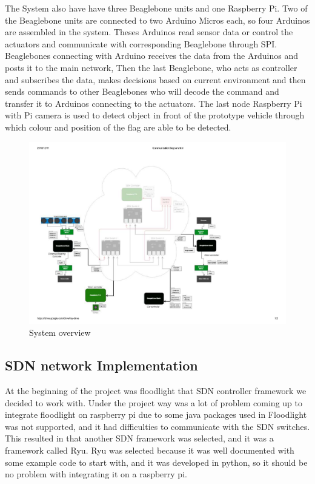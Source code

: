 \documentclass[11pt, titlepage]{article} %
\begin{document}
The System also have have three Beaglebone units and one Raspberry Pi. Two of the Beaglebone units are connected to two Arduino Micros each, so four Arduinos are assembled in the system. Theses Arduinos read sensor data or control the actuators and communicate with corresponding Beaglebone through SPI. Beaglebones connecting with Arduino receives the data from the Arduinos and posts it to the main network, Then the last Beaglebone, who  acts as controller and subscribes the data, makes decisions based on current environment and then sends commands to other Beaglebones who will decode the command and transfer it to Arduinos connecting to the actuators. The last node Raspberry Pi with Pi camera is used  to detect object in front of the prototype vehicle through which colour and position of the flag are able to be detected.

\begin{figure}
	\centering
   	\includegraphics[scale=0.7]{overview.pdf}
   	\caption{System overview}
    \label{fig:system_overview}
\end{figure}

\subsection{SDN network Implementation}

At the beginning of the project was floodlight that SDN controller framework we decided to work with. Under the project way was a lot of problem coming up to integrate floodlight on raspberry pi due to some java packages used in Floodlight was not supported, and it had difficulties to communicate with the SDN switches. This resulted in that another SDN framework was selected, and it was a framework called Ryu. Ryu was selected because it was well documented with some example code to start with, and it was developed in python, so it should be no problem with integrating it on a raspberry pi. 
\end{document}
